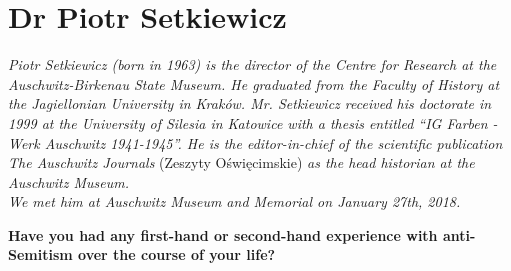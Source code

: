 \section{Dr Piotr Setkiewicz}

\textit{Piotr Setkiewicz (born in 1963) is the director of the Centre for Research at the Auschwitz-Birkenau State Museum. He graduated from the Faculty of History at the Jagiellonian University in Kraków. Mr. Setkiewicz received his doctorate in 1999 at the University of Silesia in Katowice with a thesis entitled ``IG Farben - Werk Auschwitz 1941-1945''. He is the editor-in-chief of the scientific publication The Auschwitz Journals} (Zeszyty Oświęcimskie) \textit{as the head historian at the Auschwitz Museum.\\
We met him at Auschwitz Museum and Memorial on January 27th, 2018.}\par 
\vspace*{2em}
\textbf{Have you had any first-hand or second-hand experience with anti-Semitism over the course of your life?}

